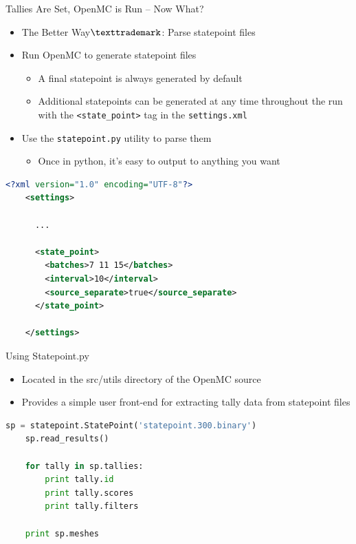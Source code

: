 \documentclass[serif]{beamer}
\begin{document}
\begin{frame}[fragile]{Tallies Are Set, OpenMC is Run -- Now What?}

  \begin{itemize}
    \item The Better Way$\texttrademark$: Parse statepoint files
    \item Run OpenMC to generate statepoint files
    \begin{itemize}
      \item A final statepoint is always generated by default
      \item Additional statepoints can be generated at any time throughout the
      run with the \verb|<state_point>| tag in the \verb|settings.xml|
    \end{itemize}
    \item Use the \verb|statepoint.py| utility to parse them
    \begin{itemize}
      \item Once in python, it's easy to output to anything you want
    \end{itemize}
  \end{itemize}

  \begin{scriptsize}
    \begin{lstlisting}[language=XML,gobble=4]
    <?xml version="1.0" encoding="UTF-8"?>
    <settings>

      ...

      <state_point>
        <batches>7 11 15</batches>
        <interval>10</interval>
        <source_separate>true</source_separate>
      </state_point>
      
    </settings>
    \end{lstlisting}
  \end{scriptsize}

\end{frame}


\begin{frame}[fragile]{Using Statepoint.py}

  \begin{itemize}
    \item Located in the src/utils directory of the OpenMC source
    \item Provides a simple user front-end for extracting tally data from
    statepoint files
  \end{itemize}

  \begin{scriptsize}
    \begin{lstlisting}[language=Python,backgroundcolor=\color{gray!20},frame=single]
    sp = statepoint.StatePoint('statepoint.300.binary')
    sp.read_results()
    
    for tally in sp.tallies:
        print tally.id
        print tally.scores
        print tally.filters

    print sp.meshes
    \end{lstlisting}
  \end{scriptsize}

\end{frame}
\end{document}
